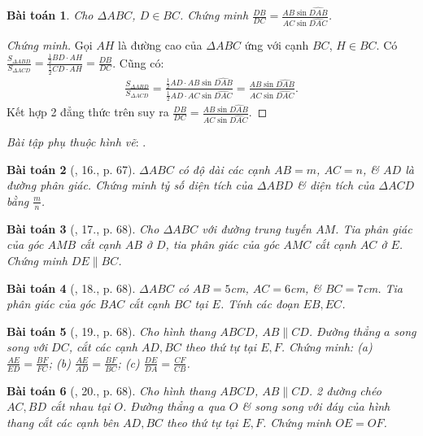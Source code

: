 \documentclass{article}
\newtheorem{baitoan}{Bài toán}
\begin{document}
\begin{baitoan}
	Cho $\Delta ABC$, $D\in BC$. Chứng minh $\frac{DB}{DC} = \frac{AB\sin\widehat{DAB}}{AC\sin\widehat{DAC}}$.
\end{baitoan}

\begin{proof}[Chứng minh]
	Gọi $AH$ là đường cao của $\Delta ABC$ ứng với cạnh $BC$, $H\in BC$. Có $\frac{S_{\Delta ABD}}{S_{\Delta ACD}} = \frac{\frac{1}{2}BD\cdot AH}{\frac{1}{2}CD\cdot AH} = \frac{DB}{DC}$. Cũng có:
	\begin{align*}
		\frac{S_{\Delta ABD}}{S_{\Delta ACD}} = \frac{\frac{1}{2}AD\cdot AB\sin\widehat{DAB}}{\frac{1}{2}AD\cdot AC\sin\widehat{DAC}} = \frac{AB\sin\widehat{DAB}}{AC\sin\widehat{DAC}}.
	\end{align*}
	Kết hợp 2 đẳng thức trên suy ra $\frac{DB}{DC} = \frac{AB\sin\widehat{DAB}}{AC\sin\widehat{DAC}}$.
\end{proof}
\noindent\textit{Bài tập phụ thuộc hình vẽ}: \cite[?2--?3, 15. p. 67]{SGK_Toan_8_tap_2}.

\begin{baitoan}[\cite{SGK_Toan_8_tap_2}, 16., p. 67]
	$\Delta ABC$ có độ dài các cạnh $AB = m$, $AC = n$, \& $AD$ là đường phân giác. Chứng minh tỷ số diện tích của $\Delta ABD$ \& diện tích của $\Delta ACD$ bằng $\frac{m}{n}$.
\end{baitoan}

\begin{baitoan}[\cite{SGK_Toan_8_tap_2}, 17., p. 68]
	Cho $\Delta ABC$ với đường trung tuyến $AM$. Tia phân giác của góc $AMB$ cắt cạnh $AB$ ở $D$, tia phân giác của góc $AMC$ cắt cạnh $AC$ ở $E$. Chứng minh $DE\parallel BC$.
\end{baitoan}

\begin{baitoan}[\cite{SGK_Toan_8_tap_2}, 18., p. 68]
	$\Delta ABC$ có $AB = 5$\emph{cm}, $AC = 6$\emph{cm}, \& $BC = 7$\emph{cm}. Tia phân giác của góc $BAC$ cắt cạnh $BC$ tại $E$. Tính các đoạn $EB,EC$.
\end{baitoan}

\begin{baitoan}[\cite{SGK_Toan_8_tap_2}, 19., p. 68]
	Cho hình thang $ABCD$, $AB\parallel CD$. Đường thẳng $a$ song song với $DC$, cắt các cạnh $AD,BC$ theo thứ tự tại $E,F$. Chứng minh: (a) $\frac{AE}{ED} = \frac{BF}{FC}$; (b) $\frac{AE}{AD} = \frac{BF}{BC}$; (c) $\frac{DE}{DA} = \frac{CF}{CB}$.
\end{baitoan}

\begin{baitoan}[\cite{SGK_Toan_8_tap_2}, 20., p. 68]
	Cho hình thang $ABCD$, $AB\parallel CD$. 2 đường chéo $AC,BD$ cắt nhau tại $O$. Đường thẳng $a$ qua $O$ \& song song với đáy của hình thang cắt các cạnh bên $AD,BC$ theo thứ tự tại $E,F$. Chứng minh $OE = OF$.	
\end{baitoan}
\end{document}
